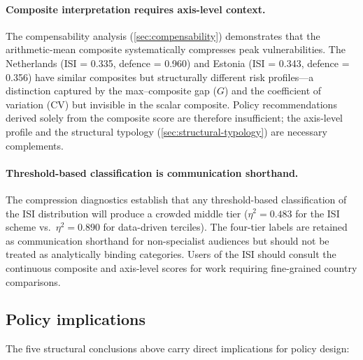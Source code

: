 \paragraph{Composite interpretation requires axis-level context.}
The compensability analysis (\cref{sec:compensability}) demonstrates
that the arithmetic-mean composite systematically compresses peak
vulnerabilities.  The Netherlands
(ISI = 0.335, defence = 0.960) and Estonia (ISI = 0.343, defence
= 0.356) have similar composites but structurally different risk
profiles---a distinction captured by the max--composite gap ($G$)
and the coefficient of variation (CV) but invisible in the scalar
composite.  Policy recommendations derived solely from the composite
score are therefore insufficient; the axis-level profile and the
structural typology (\cref{sec:structural-typology}) are necessary
complements.

\paragraph{Threshold-based classification is communication shorthand.}
The compression diagnostics establish that any threshold-based
classification of the ISI distribution will produce a crowded middle
tier ($\eta^2 = 0.483$ for the ISI scheme vs.\ $\eta^2 = 0.890$
for data-driven terciles).  The four-tier labels are retained as
communication shorthand for non-specialist audiences but should not
be treated as analytically binding categories.  Users of the ISI
should consult the continuous composite and axis-level scores for
work requiring fine-grained country comparisons.

\subsection{Policy implications}

The five structural conclusions above carry direct implications for
policy design:

